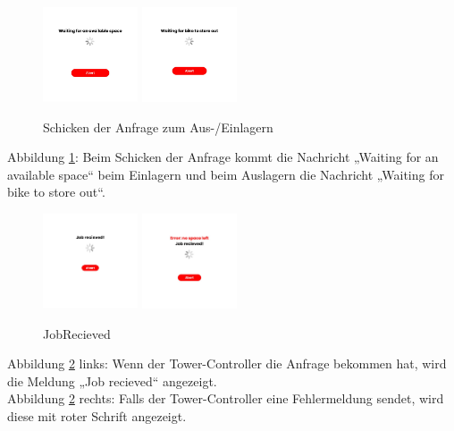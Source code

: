 \begin{figure}[H]
  \centering
  \includegraphics[width=0.25\textwidth]{images/app-screenshots/waitinga.png}
  \includegraphics[width=0.25\textwidth]{images/app-screenshots/waitingb.png}
  \caption{Schicken der Anfrage zum Aus-/Einlagern}
  \label{fig:screenwaiting}
\end{figure}
Abbildung \ref{fig:screenwaiting}: Beim Schicken der Anfrage kommt die Nachricht „Waiting for an available space“ beim Einlagern und beim Auslagern die Nachricht „Waiting for bike to store out“.\\
\begin{figure}[H]
  \centering
  \includegraphics[width=0.25\textwidth]{images/app-screenshots/recieved.png}
  \includegraphics[width=0.25\textwidth]{images/app-screenshots/error.png}
  \caption{JobRecieved}
  \label{fig:screenrecieved}
\end{figure}
Abbildung \ref{fig:screenrecieved} links: Wenn der Tower-Controller die Anfrage bekommen hat, wird die Meldung „Job recieved“ angezeigt.\\
Abbildung \ref{fig:screenrecieved} rechts: Falls der Tower-Controller eine Fehlermeldung sendet, wird diese mit roter Schrift angezeigt.\\

